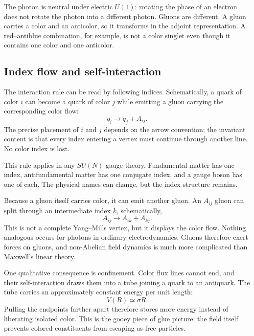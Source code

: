 The photon is neutral under electric \(U(1)\): rotating the phase of an
electron does not rotate the photon into a different photon. Gluons are
different. A gluon carries a color and an anticolor, so it transforms in the
adjoint representation. A red--antiblue combination, for example, is not a
color singlet even though it contains one color and one anticolor.

\subsection{Index flow and self-interaction}

The interaction rule can be read by following indices. Schematically, a quark
of color \(i\) can become a quark of color \(j\) while emitting a gluon carrying
the corresponding color flow:
\begin{equation}
q_i\longrightarrow q_j+A_{ij}.
\label{eq:l5-quark-gluon-vertex}
\end{equation}
The precise placement of \(i\) and \(j\) depends on the arrow convention; the
invariant content is that every index entering a vertex must continue through
another line. No color index is lost.

This rule applies in any \(SU(N)\) gauge theory. Fundamental matter has one
index, antifundamental matter has one conjugate index, and a gauge boson has
one of each. The physical names can change, but the index structure remains.

Because a gluon itself carries color, it can emit another gluon. An
\(A_{ij}\) gluon can split through an intermediate index \(k\), schematically,
\begin{equation}
A_{ij}\longrightarrow A_{ik}+A_{kj}.
\label{eq:l5-three-gluon-index}
\end{equation}
This is not a complete Yang--Mills vertex, but it displays the color flow.
Nothing analogous occurs for photons in ordinary electrodynamics. Gluons
therefore exert forces on gluons, and non-Abelian field dynamics is much more
complicated than Maxwell's linear theory.

One qualitative consequence is confinement. Color flux lines cannot end, and
their self-interaction draws them into a tube joining a quark to an antiquark.
The tube carries an approximately constant energy per unit length:
\begin{equation}
V(R)\simeq \sigma R.
\end{equation}
Pulling the endpoints farther apart therefore stores more energy instead of
liberating isolated color. This is the gooey piece of glue picture: the
field itself prevents colored constituents from escaping as free particles.

